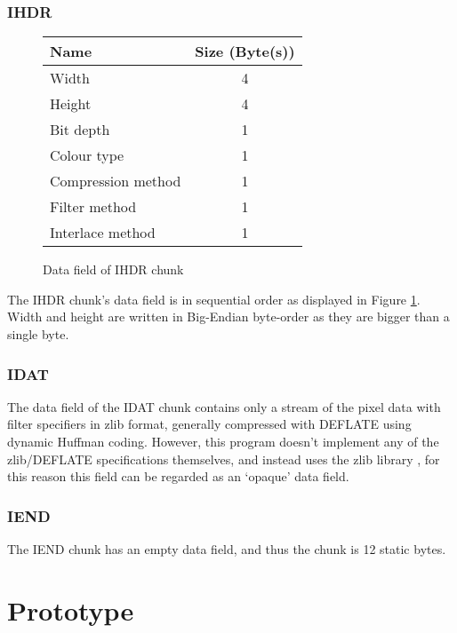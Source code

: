\documentclass{report}
\begin{document}
\subsubsection{IHDR}

\begin{figure}[!htb]
\begin{center}
  \begin{tabular}{| l | c |}
    \hline
    Name & Size (Byte(s)) \\
    \hline
    Width               & 4 \\
    Height              & 4 \\
    Bit depth           & 1 \\
    Colour type         & 1 \\
    Compression method  & 1 \\
    Filter method       & 1 \\
    Interlace method    & 1 \\
    \hline
  \end{tabular}
\end{center}
\caption{Data field of IHDR chunk}
\label{table:ihdr}
\end{figure}
\noindent
The IHDR chunk's data field is in sequential order as displayed in Figure \ref{table:ihdr}. Width and height are written in Big-Endian byte-order as they are bigger than a single byte.

\subsubsection{IDAT}

The data field of the IDAT chunk contains only a stream of the pixel data with filter specifiers in zlib format\cite{zlib}, generally compressed with DEFLATE using dynamic Huffman coding. However, this program doesn't implement any of the zlib/DEFLATE specifications themselves, and instead uses the zlib library \cite{libzlib}, for this reason this field can be regarded as an `opaque' data field.

\subsubsection{IEND}

The IEND chunk has an empty data field, and thus the chunk is 12 static bytes.

\section{Prototype}
\end{document}
